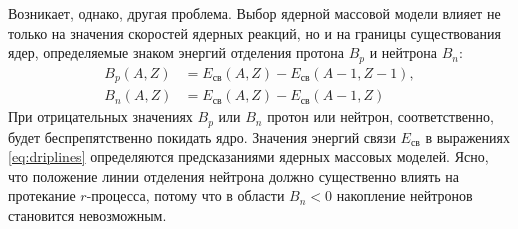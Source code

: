   Возникает, однако, другая проблема. Выбор ядерной массовой модели влияет не только на значения скоростей ядерных реакций, но и на границы существования ядер, определяемые знаком энергий отделения протона $B_p$ и нейтрона $B_n$:
  \begin{equation}\begin{aligned}\label{eq:driplines}
    B_p(A,Z) &= E_{\text{св}}(A,Z) - E_{\text{св}}(A-1,Z-1),\\
    B_n(A,Z) &= E_{\text{св}}(A,Z) - E_{\text{св}}(A-1,Z)
  \end{aligned}\end{equation}
  При отрицательных значениях $B_p$ или $B_n$ протон или нейтрон, соответственно, будет беспрепятственно покидать ядро. Значения энергий связи $E_{\text{св}}$ в выражениях \ref{eq:driplines} определяются предсказаниями ядерных массовых моделей. Ясно, что положение линии отделения нейтрона должно существенно влиять на протекание $r$-процесса, потому что в области $B_n < 0$ накопление нейтронов становится невозможным.

